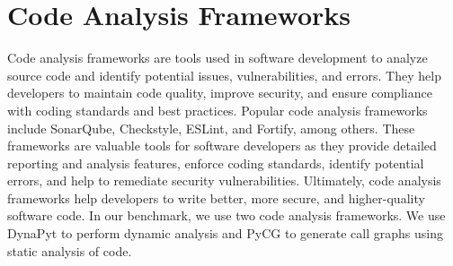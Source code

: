 
\section{Code Analysis Frameworks}
Code analysis frameworks are tools used in software development to analyze source code and identify potential issues, vulnerabilities, and errors.
They help developers to maintain code quality, improve security, and ensure compliance with coding standards and best practices.
Popular code analysis frameworks include SonarQube, Checkstyle, ESLint, and Fortify, among others.
These frameworks are valuable tools for software developers as they provide detailed reporting and analysis features, enforce coding standards, identify potential errors, and help to remediate security vulnerabilities.
Ultimately, code analysis frameworks help developers to write better, more secure, and higher-quality software code.
In our benchmark, we use two code analysis frameworks.
We use DynaPyt to perform dynamic analysis and PyCG to generate call graphs using static analysis of code.

